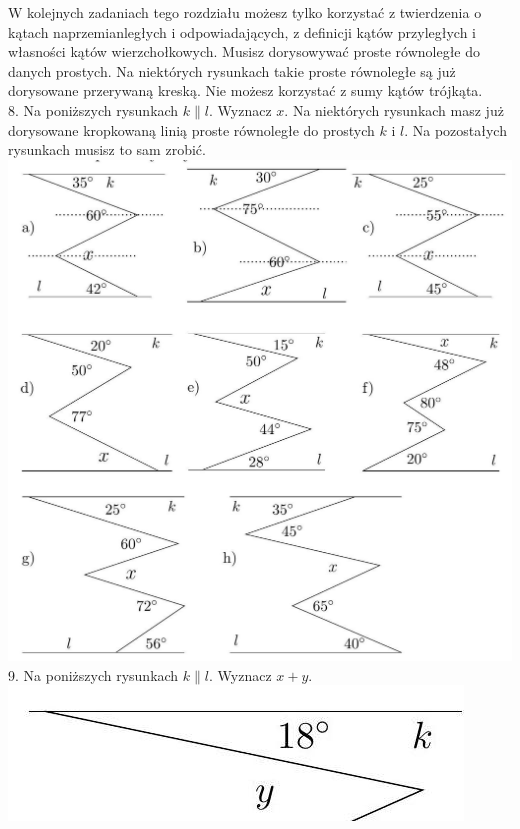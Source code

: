 \documentclass[10pt]{article}
\begin{document}
W kolejnych zadaniach tego rozdziału możesz tylko korzystać z twierdzenia o kątach naprzemianległych i odpowiadających, z definicji kątów przyległych i własności kątów wierzchołkowych. Musisz dorysowywać proste równoległe do danych prostych. Na niektórych rysunkach takie proste równoległe są już dorysowane przerywaną kreską. Nie możesz korzystać z sumy kątów trójkąta.\\
8. Na poniższych rysunkach \(k \| l\). Wyznacz \(x\). Na niektórych rysunkach masz już dorysowane kropkowaną linią proste równoległe do prostych \(k\) i \(l\). Na pozostałych rysunkach musisz to sam zrobić.\\
\includegraphics[max width=\textwidth, center]{2024_11_21_71f62bd117d375398909g-012(2)}\\
9. Na poniższych rysunkach \(k \| l\). Wyznacz \(x+y\).\\
\includegraphics[max width=\textwidth, center]{2024_11_21_71f62bd117d375398909g-012}\\
\end{document}
